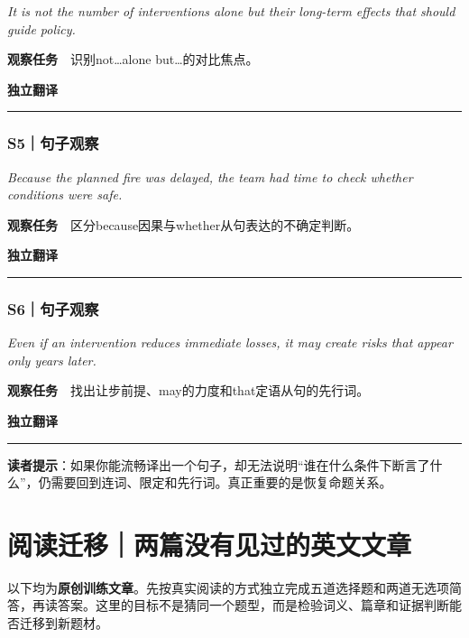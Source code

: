 \documentclass[
  11pt,
]{ctexart}
\renewenvironment{quote}{\begin{tcolorbox}[enhanced,breakable,colback=sand,colframe=primary!22,boxrule=0.4pt,arc=2pt,left=2.6mm,right=2.6mm,top=1.6mm,bottom=1.6mm]\itshape}{\end{tcolorbox}}
\begin{document}
\begin{quote}
It is not the number of interventions alone but their long-term effects
that should guide policy.
\end{quote}

\textbf{观察任务}　识别not\ldots alone but\ldots 的对比焦点。

\textbf{独立翻译}　

\rule{0.8\linewidth}{0.35pt}

\subsubsection{S5｜句子观察}\label{s5ux53e5ux5b50ux89c2ux5bdf}

\begin{quote}
Because the planned fire was delayed, the team had time to check whether
conditions were safe.
\end{quote}

\textbf{观察任务}　区分because因果与whether从句表达的不确定判断。

\textbf{独立翻译}　

\rule{0.8\linewidth}{0.35pt}

\subsubsection{S6｜句子观察}\label{s6ux53e5ux5b50ux89c2ux5bdf}

\begin{quote}
Even if an intervention reduces immediate losses, it may create risks
that appear only years later.
\end{quote}

\textbf{观察任务}　找出让步前提、may的力度和that定语从句的先行词。

\textbf{独立翻译}　

\rule{0.8\linewidth}{0.35pt}

\textbf{读者提示}：如果你能流畅译出一个句子，却无法说明``谁在什么条件下断言了什么''，仍需要回到连词、限定和先行词。真正重要的是恢复命题关系。

\section{阅读迁移｜两篇没有见过的英文文章}\label{ux9605ux8bfbux8fc1ux79fbux4e24ux7bc7ux6ca1ux6709ux89c1ux8fc7ux7684ux82f1ux6587ux6587ux7ae0}

以下均为\textbf{原创训练文章}。先按真实阅读的方式独立完成五道选择题和两道无选项简答，再读答案。这里的目标不是猜同一个题型，而是检验词义、篇章和证据判断能否迁移到新题材。
\end{document}

